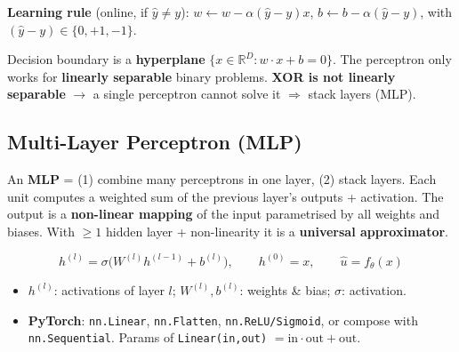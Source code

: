\documentclass[10pt,a4paper]{article}
\begin{document}
	\begin{center}
	\end{center}

	\textbf{Learning rule} (online, if $\hat y\neq y$): $w\leftarrow w-\alpha(\hat y-y)x$, \; $b\leftarrow b-\alpha(\hat y-y)$, with $(\hat y-y)\in\{0,+1,-1\}$.

	\begin{importantbox}
		Decision boundary is a \textbf{hyperplane} $\{x\in\mathbb{R}^D : w\cdot x+b=0\}$. The perceptron only works for \textbf{linearly separable} binary problems. \textbf{XOR is not linearly separable} $\rightarrow$ a single perceptron cannot solve it $\Rightarrow$ stack layers (MLP).
	\end{importantbox}

	\subsection{Multi-Layer Perceptron (MLP)}

	\begin{definitionbox}
		An \textbf{MLP} = (1) combine many perceptrons in one layer, (2) stack layers. Each unit computes a weighted sum of the previous layer's outputs + activation. The output is a \textbf{non-linear mapping} of the input parametrised by all weights and biases. With $\geq 1$ hidden layer + non-linearity it is a \textbf{universal approximator}.
	\end{definitionbox}

	\begin{formulabox}
		\[
		h^{(l)} = \sigma\!\big(W^{(l)} h^{(l-1)} + b^{(l)}\big), \qquad h^{(0)} = x, \qquad \hat u = f_\theta(x)
		\]
	\end{formulabox}
	\begin{itemize}[leftmargin=*]
		\item $h^{(l)}$: activations of layer $l$; \quad $W^{(l)}, b^{(l)}$: weights \& bias; \quad $\sigma$: activation.
		\item \textbf{PyTorch}: \texttt{nn.Linear}, \texttt{nn.Flatten}, \texttt{nn.ReLU/Sigmoid}, or compose with \texttt{nn.Sequential}. Params of \texttt{Linear(in,out)} $= \text{in}\cdot\text{out}+\text{out}$.
	\end{itemize}
\end{document}

